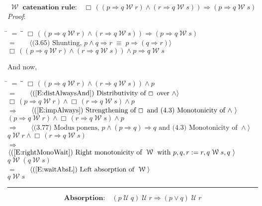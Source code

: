 \documentclass[12pt, fleqn, leqno]{article}
\newcommand{\lgap}{2pt}                             %
\newcommand{\mymathindent}{24pt}                    %
\newcommand{\equivs}{\ensuremath{\;\equiv\;}}       %
\newcommand{\impl}{\ensuremath{\Rightarrow}}        %
\newcommand{\Until}{\;\mathcal{U}\;}
\newcommand{\Wait}{\;\mathcal{W}\;}
\newcommand{\Always}{\Box\,}
\newcommand{\myqed}{\rule[-.23ex]{1.2ex}{2.0ex}}
\newcommand{\myqedtab}{\hspace{384pt}}              %
\newcommand{\Gll} {\langle}                         %
\newcommand{\Ggg} {\rangle}                         %
\newcommand{\Hint}[1]     {\ \ \ $\Gll              \mbox{#1} \Ggg$ }   %
\begin{document}
\begin{equation}\label{E:waitCatRule}
\textbf{$\Wait$ catenation rule:}\quad \Always ((p \impl q \Wait r) \land (r \impl q \Wait s)) \impl (p \impl q \Wait s)
\end{equation}
\emph{Proof}:
\begin{tabbing}
\hspace{\mymathindent} \= $= \;$ \= \myqedtab \= \kill
  \> \>   $\Always ((p \impl q \Wait r) \land (r \impl q \Wait s)) \impl (p \impl q \Wait s)$\\[\lgap]
  \> $=$  \>  \Hint{(3.65) Shunting, $p\land q\impl r\equivs p\impl (q\impl r)$}\\[\lgap]
  \> \>   $\Always ((p \impl q \Wait r) \land (r \impl q \Wait s)) \land p \impl q \Wait s$
\end{tabbing}
And now,
\begin{tabbing}
\hspace{\mymathindent} \= $= \;$ \= \myqedtab \= \kill
  \> \>   $\Always ((p \impl q \Wait r) \land (r \impl q \Wait s)) \land p$\\[\lgap]
  \> $=$  \>  \Hint{(\ref{E:distAlwaysAnd}) Distributivity of $\Always$ over $\land$}\\[\lgap]
   \> \>   $\Always (p \impl q \Wait r) \land \Always (r \impl q \Wait s) \land p$\\[\lgap]
     \> $\impl$  \>  \Hint{(\ref{E:impAlways}) Strengthening of $\Always$ and (4.3) Monotonicity of $\land$ }\\[\lgap]
      \> \>   $(p \impl q \Wait r) \land \Always (r \impl q \Wait s) \land p$\\[\lgap]
      \> $\impl$  \>  \Hint{(3.77) Modus ponens, $p\land (p\impl q)\impl q$ and (4.3) Monotonicity of $\land$}\\[\lgap]
       \> \>   $q \Wait r \land \Always (r \impl q \Wait s)$\\[\lgap]
   \> $\impl$  \>  \Hint{(\ref{E:rightMonoWait}) Right monotonicity of $\Wait$ with $p, q, r := r, q \Wait s, q$ }\\[\lgap]
    \> \>   $q \Wait (q \Wait s)$\\[\lgap]  
    \> $=$  \>  \Hint{(\ref{E:waitAbsL}) Left absorption of $\Wait$}\\[\lgap]
      \> \>   $q \Wait s$ \quad \myqed
\end{tabbing}
\begin{equation}\label{E:untilImpAbsR}
\textbf{Absorption:}\quad (p \Until q) \Until r \impl (p \lor q) \Until r
\end{equation}
\end{document}
